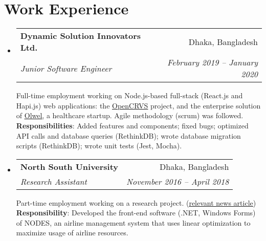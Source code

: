 \documentclass[letter-paper,10pt]{article}
\makeatletter
\newcommand{\resumeItem}[2]{
  \item\small{
    \textbf{#1}{: #2 \vspace{-2pt}}
  }
}
\newcommand{\resumeSubheading}[4]{
  \vspace{-1pt}\item
    \begin{tabular*}{0.97\textwidth}[t]{l@{\extracolsep{\fill}}r}
      \textbf{#1} & #2 \\
      \textit{#3} & \textit{ #4} \\
    \end{tabular*}\vspace{-5pt}
}
\newcommand{\resumeSubSubheading}[2]{
    \begin{tabular*}{0.97\textwidth}{l@{\extracolsep{\fill}}r}
      \textit{\small#1} & \textit{\small #2} \\
    \end{tabular*}\vspace{-5pt}
}
\newcommand{\resumeSubHeadingListStart}{\begin{itemize}[leftmargin=*]}
\newcommand{\resumeSubHeadingListEnd}{\end{itemize}}
\newcommand{\resumeItemListStart}{\begin{itemize}}
\newcommand{\resumeItemListEnd}{\end{itemize}\vspace{-5pt}}
\makeatother
\begin{document}
\section{Work Experience}
  \resumeSubHeadingListStart

    \resumeSubheading
      {Dynamic Solution Innovators Ltd.}{Dhaka, Bangladesh}
      {Junior Software Engineer}{February 2019 -- January 2020}
      
      Full-time employment working on Node.js-based full-stack (React.js and Hapi.js) web applications: the \href{https://opencrvs.org}{\underline{OpenCRVS}} project, and the enterprise solution of \href{https://olwel.com}{\underline{Olwel}}, a healthcare startup. Agile methodology (scrum) was followed.
      \newline
      \textbf{Responsibilities}: Added features and components; fixed bugs; optimized API calls and database queries (RethinkDB); wrote database migration scripts (RethinkDB); wrote unit tests (Jest, Mocha).\newline [View my commits for OpenCRVS on GitHub \href{https://github.com/opencrvs/opencrvs-core/commits?author=maacpiash}{\underline{here}}]
      

    \resumeSubheading
      {North South University}{Dhaka, Bangladesh}
      {Research Assistant}{November 2016 -- April 2018}
      
      Part-time employment working on a research project. (\href{http://www.ipsnews.net/2017/05/flying-green-in-bangladesh/}{\underline{relevant news article}})
      \newline
      \textbf{Responsibility}: Developed the front-end software (.NET, Windows Forms) of NODES, an airline management system that uses linear optimization to maximize usage of airline resources.
     
  \resumeSubHeadingListEnd
  
\end{document}
